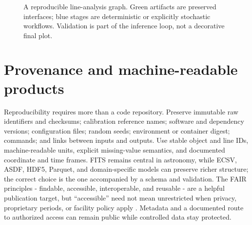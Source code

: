 \begin{figure}[htbp]
\centering
{}
\caption{A reproducible line-analysis graph.  Green artifacts are preserved
interfaces; blue stages are deterministic or explicitly stochastic workflows.
Validation is part of the inference loop, not a decorative final plot.}
\label{fig:reproducible-dag}
\end{figure}

\section{Provenance and machine-readable products}

Reproducibility requires more than a code repository.  Preserve immutable raw
identifiers and checksums; calibration reference names; software and dependency
versions; configuration files; random seeds; environment or container digest;
commands; and links between inputs and outputs.  Use stable object and line IDs,
machine-readable units, explicit missing-value semantics, and documented
coordinate and time frames.  FITS remains central in astronomy, while ECSV,
ASDF, HDF5, Parquet, and domain-specific models can preserve richer structure;
the correct choice is the one accompanied by a schema and validation.
The FAIR principles - findable, accessible, interoperable, and reusable - are a
helpful publication target, but ``accessible'' need not mean unrestricted when
privacy, proprietary periods, or facility policy apply \citep{Wilkinson2016}.
Metadata and a documented route to authorized access can remain public while
controlled data stay protected.

